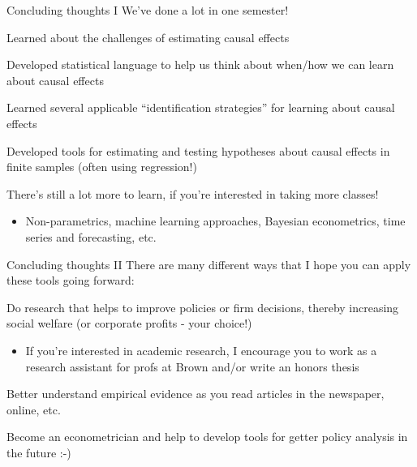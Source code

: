 \documentclass[11pt,english,handout]{beamer}
\newenvironment{wideitemize}{\itemize\addtolength{\itemsep}{10pt}}{\enditemize}
\begin{document}
\begin{frame}{Concluding thoughts I}
We've done a lot in one semester! \medskip

\begin{wideitemize}
	\item
	Learned about the challenges of estimating causal effects
	
	\item
	Developed statistical language to help us think about when/how we can learn about causal effects
	
	\item
	Learned several applicable ``identification strategies'' for learning about causal effects
	
	\item
	Developed tools for estimating and testing hypotheses about causal effects in finite samples (often using regression!)
\end{wideitemize}

\pause
\medskip
There's still a lot more to learn, if you're interested in taking more classes!
	\begin{itemize}
		\item 
		Non-parametrics, machine learning approaches, Bayesian econometrics, time series and forecasting, etc.
	\end{itemize}

\end{frame}

\begin{frame}{Concluding thoughts II}
There are many different ways that I hope you can apply these tools going forward: \medskip

\begin{wideitemize}
	\item
	Do research that helps to improve policies or firm decisions, thereby increasing social welfare (or corporate profits - your choice!)
	
		\begin{itemize}
			\item 
			If you're interested in academic research, I encourage you to work as a research assistant for profs at Brown and/or write an honors thesis
		\end{itemize}
	
	\item
	Better understand empirical evidence as you read articles in the newspaper, online, etc.
	
	\item
	Become an econometrician and help to develop tools for getter policy analysis in the future :-) 
	
	
\end{wideitemize}

	
\end{frame}
\end{document}
